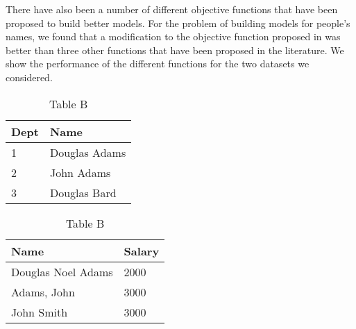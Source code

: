 There have also been a number of different objective functions that have been proposed to build better models.  For the problem of building models for people's names, we found that a modification to the objective function proposed in \cite{DBLP:conf/cvpr/SchroffKP15} was better than three other functions that have been proposed in the literature. We show the performance of the different functions for the two datasets we considered.

\begin{table}[!htb]
    \caption{Example of a merge problem}
    \begin{subtable}{.5\linewidth}
      \centering
        \caption{Table A}
        \begin{tabular}{|l|l|}
          \hline
           Dept & Name \\
           \hline
           1    & Douglas Adams \\
           2    & John Adams \\
           3  & Douglas Bard \\
           \hline
        \end{tabular}
    \end{subtable}%
    \begin{subtable}{.5\linewidth}
      \centering
        \caption{Table B}
        \begin{tabular}{|l|l|}
          \hline
           Name & Salary \\
           \hline
           Douglas Noel Adams & 2000 \\
           Adams, John & 3000 \\
           John Smith & 3000 \\
           \hline
        \end{tabular}
    \end{subtable}
    \label{table-example}
\end{table}

